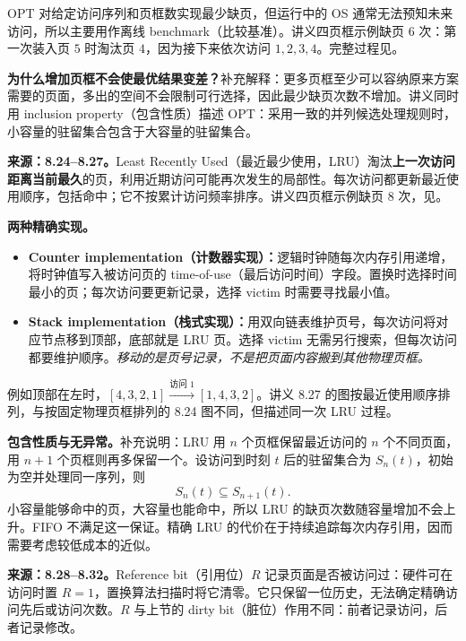 OPT 对给定访问序列和页框数实现最少缺页，但运行中的 OS 通常无法预知未来访问，所以主要用作离线 benchmark（比较基准）。讲义四页框示例缺页 $6$ 次：第一次装入页 $5$ 时淘汰页 $4$，因为接下来依次访问 $1,2,3,4$。完整过程见。

\textbf{为什么增加页框不会使最优结果变差？}补充解释：更多页框至少可以容纳原来方案需要的页面，多出的空间不会限制可行选择，因此最少缺页次数不增加。讲义同时用 inclusion property（包含性质）描述 OPT：采用一致的并列候选处理规则时，小容量的驻留集合包含于大容量的驻留集合。


\textbf{来源：8.24--8.27。}Least Recently Used（最近最少使用，LRU）淘汰\textbf{上一次访问距离当前最久}的页，利用近期访问可能再次发生的局部性。每次访问都更新最近使用顺序，包括命中；它不按累计访问频率排序。讲义四页框示例缺页 $8$ 次，见。

\textbf{两种精确实现。}
\begin{itemize}
  \item \textbf{Counter implementation（计数器实现）：}逻辑时钟随每次内存引用递增，将时钟值写入被访问页的 time-of-use（最后访问时间）字段。置换时选择时间最小的页；每次访问要更新记录，选择 victim 时需要寻找最小值。
  \item \textbf{Stack implementation（栈式实现）：}用双向链表维护页号，每次访问将对应节点移到顶部，底部就是 LRU 页。选择 victim 无需另行搜索，但每次访问都要维护顺序。\emph{移动的是页号记录，不是把页面内容搬到其他物理页框。}
\end{itemize}

例如顶部在左时，$[4,3,2,1]\xrightarrow{\text{访问 }1}[1,4,3,2]$。讲义 8.27 的图按最近使用顺序排列，与按固定物理页框排列的 8.24 图不同，但描述同一次 LRU 过程。

\textbf{包含性质与无异常。}补充说明：LRU 用 $n$ 个页框保留最近访问的 $n$ 个不同页面，用 $n+1$ 个页框则再多保留一个。设访问到时刻 $t$ 后的驻留集合为 $S_n(t)$，初始为空并处理同一序列，则
\[
  S_n(t)\subseteq S_{n+1}(t).
\]
小容量能够命中的页，大容量也能命中，所以 LRU 的缺页次数随容量增加不会上升。FIFO 不满足这一保证。精确 LRU 的代价在于持续追踪每次内存引用，因而需要考虑较低成本的近似。


\textbf{来源：8.28--8.32。}Reference bit（引用位）$R$ 记录页面是否被访问过：硬件可在访问时置 $R=1$，置换算法扫描时将它清零。它只保留一位历史，无法确定精确访问先后或访问次数。$R$ 与上节的 dirty bit（脏位）作用不同：前者记录访问，后者记录修改。

